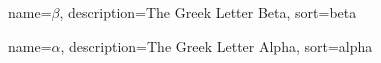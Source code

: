 
{
  name={\ensuremath{\beta}},
  description={The Greek Letter Beta},
  sort=beta
}

{
  name={\ensuremath{\alpha}},
  description={The Greek Letter Alpha},
  sort=alpha
}
